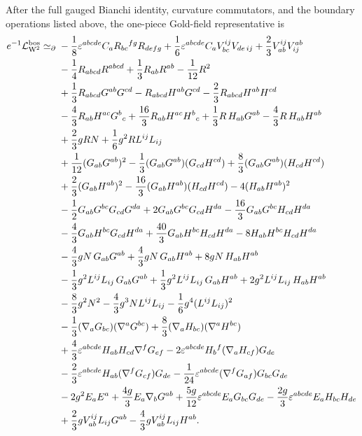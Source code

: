 \documentclass[11pt]{article}
\newcommand{\cL}{\mathcal L}
\newcommand{\eps}{\varepsilon}
\newcommand{\simeqbd}{\mathrel{\simeq}_{\partial}}
\newcommand{\Weyl}{\mathrm W}
\begin{document}
After the full gauged Bianchi identity, curvature commutators, and the
boundary operations listed above, the one-piece Gold-field representative is
\begingroup
\small
\begin{align}
e^{-1}\cL_{\Weyl^2}^{\rm bos}\simeqbd{}&
-\frac18\eps^{abcde}C_aR_{bc}{}^{fg}R_{de fg}
+\frac16\eps^{abcde}C_aV_{bc}^{ij}V_{de\,ij}
+\frac23V_{ab}^{ij}V^{ab}_{ij}
\nonumber\\
&-\frac14R_{abcd}R^{abcd}+\frac13R_{ab}R^{ab}-\frac1{12}R^2
\nonumber\\
&+\frac13R_{abcd}G^{ab}G^{cd}
-R_{abcd}H^{ab}G^{cd}
-\frac23R_{abcd}H^{ab}H^{cd}
\nonumber\\
&-\frac43R_{ab}H^{ac}G^b{}_c
+\frac{16}{3}R_{ab}H^{ac}H^b{}_c
+\frac13R\,H_{ab}G^{ab}-\frac43R\,H_{ab}H^{ab}
\nonumber\\
&+\frac23gRN+\frac16g^2R L^{ij}L_{ij}
\nonumber\\
&+\frac1{12}(G_{ab}G^{ab})^2
-\frac13(G_{ab}G^{ab})(G_{cd}H^{cd})
+\frac83(G_{ab}G^{ab})(H_{cd}H^{cd})
\nonumber\\
&+\frac23(G_{ab}H^{ab})^2
-\frac{16}{3}(G_{ab}H^{ab})(H_{cd}H^{cd})
-4(H_{ab}H^{ab})^2
\nonumber\\
&-\frac12G_{ab}G^{bc}G_{cd}G^{da}
+2G_{ab}G^{bc}G_{cd}H^{da}
-\frac{16}{3}G_{ab}G^{bc}H_{cd}H^{da}
\nonumber\\
&-\frac43G_{ab}H^{bc}G_{cd}H^{da}
+\frac{40}{3}G_{ab}H^{bc}H_{cd}H^{da}
-8H_{ab}H^{bc}H_{cd}H^{da}
\nonumber\\
&-\frac43gN\,G_{ab}G^{ab}
+\frac43gN\,G_{ab}H^{ab}
+8gN\,H_{ab}H^{ab}
\nonumber\\
&-\frac13g^2L^{ij}L_{ij}\,G_{ab}G^{ab}
+\frac13g^2L^{ij}L_{ij}\,G_{ab}H^{ab}
+2g^2L^{ij}L_{ij}\,H_{ab}H^{ab}
\nonumber\\
&-\frac83g^2N^2-\frac43g^3N L^{ij}L_{ij}
-\frac16g^4(L^{ij}L_{ij})^2
\nonumber\\
&-\frac13(\nabla_aG_{bc})(\nabla^aG^{bc})
+\frac83(\nabla_aH_{bc})(\nabla^aH^{bc})
\nonumber\\
&+\frac43\eps^{abcde}H_{ab}H_{cd}\nabla^fG_{ef}
-2\eps^{abcde}H_b{}^f(\nabla_aH_{cf})G_{de}
\nonumber\\
&-\frac23\eps^{abcde}H_{ab}(\nabla^fG_{cf})G_{de}
-\frac1{24}\eps^{abcde}(\nabla^fG_{af})G_{bc}G_{de}
\nonumber\\
&-2g^2E_aE^a+\frac{4g}{3}E_a\nabla_bG^{ab}
+\frac{5g}{12}\eps^{abcde}E_aG_{bc}G_{de}
-\frac{2g}{3}\eps^{abcde}E_aH_{bc}H_{de}
\nonumber\\
&+\frac23gV_{ab}^{ij}L_{ij}G^{ab}
-\frac43gV_{ab}^{ij}L_{ij}H^{ab}.
\label{eq:W-final-expanded}
\end{align}
\endgroup
\end{document}
